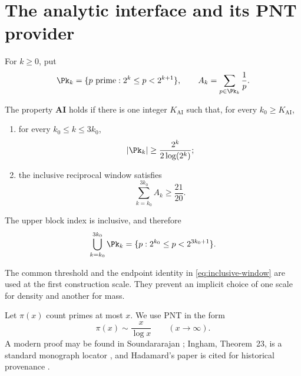 \section{The analytic interface and its PNT provider}\label{sec:analytic}

For $k\ge0$, put
\[
 \Pk_k=\{p\text{ prime}:2^k\le p<2^{k+1}\},
 \qquad
 A_k=\sum_{p\in\Pk_k}\frac1p.
\]

\begin{definition}\label{def:AI}
The property $\mathbf{AI}$ holds if there is one integer $K_{\mathrm{AI}}$ such
that, for every $k_0\ge K_{\mathrm{AI}}$,
\begin{enumerate}[label=(\alph*)]
\item for every $k_0\le k\le3k_0$,
\begin{equation}\label{eq:AI-density}
 |\Pk_k|\ge\frac{2^k}{2\log(2^k)};
\end{equation}
\item the inclusive reciprocal window satisfies
\begin{equation}\label{eq:AI-mass}
 \sum_{k=k_0}^{3k_0}A_k\ge\frac{21}{20}.
\end{equation}
\end{enumerate}
The upper block index is inclusive, and therefore
\begin{equation}\label{eq:inclusive-window}
 \bigcup_{k=k_0}^{3k_0}\Pk_k
 =\{p:2^{k_0}\le p<2^{3k_0+1}\}.
\end{equation}
\end{definition}

The common threshold and the endpoint identity in
\eqref{eq:inclusive-window} are used at the first construction scale.  They
prevent an implicit choice of one scale for density and another for mass.

Let $\pi(x)$ count primes at most $x$.  We use PNT in the form
\begin{equation}\label{eq:PNT}
 \pi(x)\sim\frac{x}{\log x}\qquad(x\to\infty).
\end{equation}
A modern proof may be found in Soundararajan \cite{Soundararajan2006}; Ingham,
Theorem~23, is a standard monograph locator \cite{Ingham1990}, and Hadamard's
paper is cited for historical provenance \cite{Hadamard1896}.

